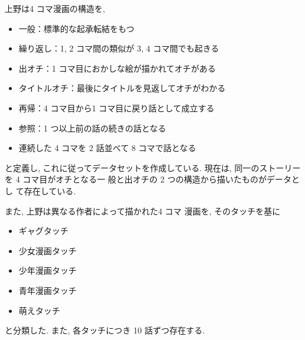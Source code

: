 上野は4 コマ漫画の構造を,

\begin{itemize}
  \item 一般：標準的な起承転結をもつ
  \item 繰り返し：1, 2 コマ間の類似が 3, 4 コマ間でも起きる
  \item 出オチ：1 コマ目におかしな絵が描かれてオチがある
  \item タイトルオチ：最後にタイトルを見返してオチがわかる
  \item 再帰：4 コマ目から1 コマ目に戻り話として成立する
  \item 参照：1 つ以上前の話の続きの話となる
  \item 連続した 4 コマを 2 話並べて 8 コマで話となる
\end{itemize}

と定義し, これに従ってデータセットを作成している.
現在は, 同一のストーリーを 4 コマ目がオチとなる一
般と出オチの 2 つの構造から描いたものがデータとし
て存在している.

また, 上野は異なる作者によって描かれた4 コマ
漫画を, そのタッチを基に

\begin{itemize}
  \item ギャグタッチ
  \item 少女漫画タッチ
  \item 少年漫画タッチ
  \item 青年漫画タッチ
  \item 萌えタッチ
\end{itemize}

と分類した. また, 各タッチにつき 10 話ずつ存在する.
